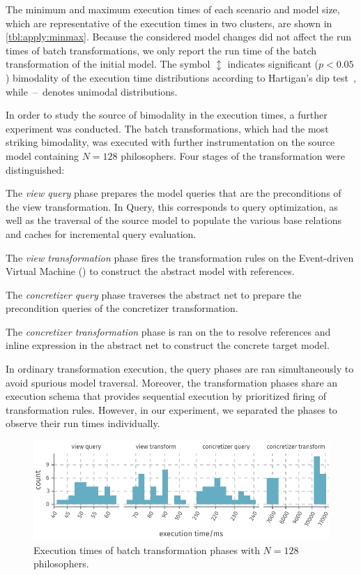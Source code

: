 The minimum and maximum execution times of each scenario and model size, which are representative of the execution times in two clusters, are shown in \cref{tbl:apply:minmax}. Because the considered model changes did not affect the run times of batch transformations, we only report the run time of the batch transformation of the initial model. The symbol \(\updownarrow\) indicates significant (\(p < 0.05\)) bimodality of the execution time distributions according to Hartigan's dip test~\citep{Maechler16diptest}, while~--~denotes unimodal distributions.

In order to study the source of bimodality in the execution times, a further experiment was conducted. The batch transformations, which had the most striking bimodality, was executed with further instrumentation on the source model containing \(N = 128\) philosophers. Four stages of the transformation were distinguished:
\begin{enumerate*}
\item The \emph{view query} phase prepares the model queries that are the preconditions of the view transformation. In  Query, this corresponds to query optimization, as well as the traversal of the source model to populate the various base relations and caches for incremental query evaluation.
\item The \emph{view transformation} phase fires the transformation rules on the  Event-driven Virtual Machine () to construct the abstract  model with references.
\item The \emph{concretizer query} phase traverses the abstract net to prepare the precondition queries of the concretizer transformation.
\item The \emph{concretizer transformation} phase is ran on the  to resolve references and inline expression in the abstract net to construct the concrete  target model.
\end{enumerate*}
In ordinary transformation execution, the query phases are ran simultaneously to avoid spurious model traversal. Moreover, the transformation phases share an  execution schema that provides sequential execution by prioritized firing of transformation rules. However, in our experiment, we separated the phases to observe their run times individually.

\begin{figure}
  \centering
  \includegraphics{figures/plot_histogram}
  \caption{Execution times of batch transformation phases with \(N = 128\) philosophers.}
  \label{fig:apply:histogram}
\end{figure}

